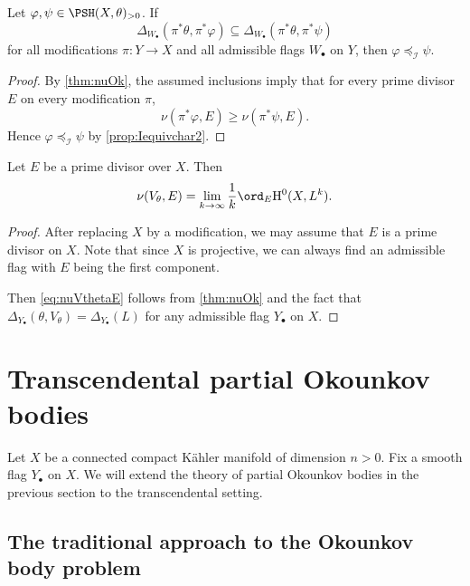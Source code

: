 \begin{corollary}\label{cor:Deltacontimplyvarphi}
	Let $\varphi,\psi\in \PSH(X,\theta)_{>0}$. If
	\[
		\Delta_{W_{\bullet}}(\pi^*\theta,\pi^*\varphi)\subseteq \Delta_{W_{\bullet}}(\pi^*\theta,\pi^*\psi)
	\]
	for all modifications $\pi\colon Y\rightarrow X$ and all admissible flags $W_{\bullet}$ on $Y$, then $\varphi\preceq_{\mathcal{I}} \psi$.
\end{corollary}
\begin{proof}
    By \cref{thm:nuOk}, the assumed inclusions imply that for every prime divisor $E$ on every modification $\pi$,
    \[
    \nu(\pi^*\varphi,E)\geq \nu(\pi^*\psi,E).
    \]
    Hence $\varphi\preceq_{\mathcal{I}}\psi$ by \cref{prop:Iequivchar2}.
\end{proof}
\begin{corollary}\label{cor:numin}
	Let $E$ be a prime divisor over $X$. Then
	\begin{equation}\label{eq:nuVthetaE}
		\nu(V_{\theta},E)=\lim_{k\to\infty}\frac{1}{k}\ord_E \mathrm{H}^0(X,L^k).
	\end{equation}
\end{corollary}

\begin{proof}
    After replacing $X$ by a modification, we may assume that $E$ is a prime divisor on $X$.
    Note that since $X$ is projective, we can always find an admissible flag with $E$ being the first component.

	Then \eqref{eq:nuVthetaE} follows from \cref{thm:nuOk} and the fact that $\Delta_{Y_{\bullet}}(\theta,V_{\theta})=\Delta_{Y_{\bullet}}(L)$ for any admissible flag $Y_{\bullet}$ on $X$.
\end{proof}






\section{Transcendental partial Okounkov bodies}\label{sec:tpob}
Let $X$ be a connected compact Kähler manifold of dimension $n>0$.
Fix a smooth flag $Y_{\bullet}$ on $X$. We will extend the theory of partial Okounkov bodies in the previous section to the transcendental setting.

\subsection{The traditional approach to the Okounkov body problem}
\label{subsec:trad_approach}

